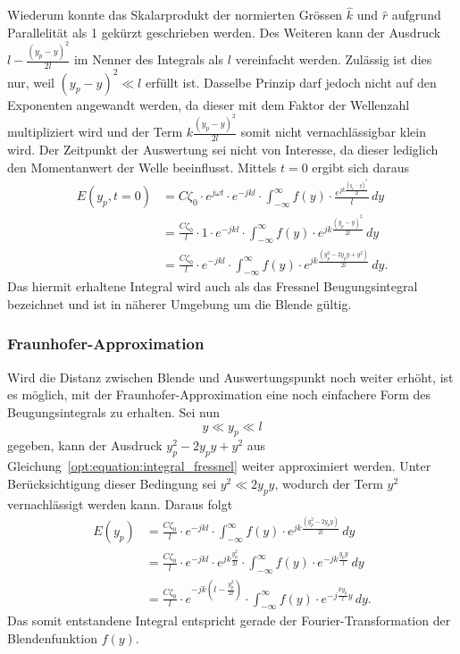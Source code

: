 Wiederum konnte das Skalarprodukt der normierten Grössen $\hat{k}$ und $\hat{r}$ aufgrund Parallelität als 1 gekürzt geschrieben werden.
Des Weiteren kann der Ausdruck $l - \frac{(y_p-y)^2}{2l}$ im Nenner des Integrals als $l$ vereinfacht werden.
Zulässig ist dies nur, weil $(y_p - y)^2 \ll l$ erfüllt ist.
Dasselbe Prinzip darf jedoch nicht auf den Exponenten angewandt werden, da dieser mit dem Faktor der Wellenzahl multipliziert wird und der Term $k \frac{(y_p-y)^2}{2l}$ somit nicht vernachlässigbar klein wird.
Der Zeitpunkt der Auswertung sei nicht von Interesse, da dieser lediglich den Momentanwert der Welle beeinflusst.
Mittels $t = 0$ ergibt sich daraus
\begin{align}
E(y_p, t = 0)
&=
C\zeta_0 \cdot e^{j\omega t} \cdot e^{-jkl} \cdot \int_{-\infty}^{\infty}f(y)\cdot\frac{e^{jk\frac{(y_p-y)^2}{2l}}}{l} \,dy
\\
&=
\frac{C\zeta_0}{l} \cdot 1 \cdot e^{-jkl} \cdot \int_{-\infty}^{\infty}f(y)\cdot e^{jk\frac{(y_p-y)^2}{2l}} \,dy
\\
&=
\frac{C\zeta_0}{l} \cdot e^{-jkl} \cdot \int_{-\infty}^{\infty}f(y)\cdot e^{jk\frac{(y_p^2 - 2y_py + y^2)}{2l}} \,dy
.
\label{opt:equation:integral_fressnel}
\end{align}
Das hiermit erhaltene Integral wird auch als das Fressnel Beugungsintegral bezeichnet und ist in näherer Umgebung um die Blende gültig.

\subsubsection{Fraunhofer-Approximation}
Wird die Distanz zwischen Blende und Auswertungspunkt noch weiter erhöht, ist es möglich, mit der Fraunhofer-Approximation eine noch einfachere Form des Beugungsintegrals zu erhalten.
Sei nun
\begin{equation}
y
\ll
y_p
\ll
l
\end{equation}
gegeben, kann der Ausdruck $y_p^2 - 2y_py + y^2$ aus Gleichung~\ref{opt:equation:integral_fressnel} weiter approximiert werden.
Unter Berücksichtigung dieser Bedingung sei $y^2 \ll 2y_py$, wodurch der Term $y^2$ vernachlässigt werden kann.
Daraus folgt
\begin{align}
E(y_p)
&=
\frac{C\zeta_0}{l} \cdot e^{-jkl} \cdot \int_{-\infty}^{\infty}f(y)\cdot e^{jk\frac{(y_p^2 - 2y_py)}{2l}} \,dy
\\
&=
\frac{C\zeta_0}{l} \cdot e^{-jkl} \cdot e^{jk\frac{y_p^2}{2l}} \cdot \int_{-\infty}^{\infty}f(y)\cdot e^{-jk\frac{y_py}{l}} \,dy
\\
&=
\frac{C\zeta_0}{l} \cdot e^{-jk\left(l-\frac{y_p^2}{2l}\right)} \cdot \int_{-\infty}^{\infty}f(y)\cdot e^{-j\frac{ky_p}{l}y} \,dy
.
\label{opt:equation:integral_fraunhofer}
\end{align}
Das somit entstandene Integral entspricht gerade der Fourier-Transformation der Blendenfunktion $f(y)$.

